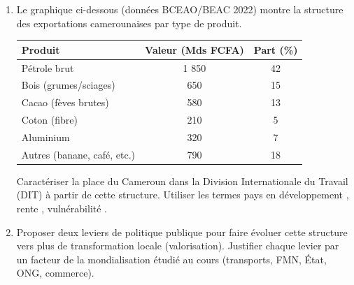 \documentclass[11pt]{article}
\begin{document}
\begin{exercice}
\begin{enumerate}
    \item Le graphique ci-dessous (données BCEAO/BEAC 2022) montre la structure des exportations camerounaises par type de produit. 
    
    \begin{center}
    \begin{tabular}{lcc}
        \hline
        \textbf{Produit} & \textbf{Valeur (Mds FCFA)} & \textbf{Part (\%)} \\
        \hline
        Pétrole brut & 1 850 & 42 \\
        Bois (grumes/sciages) & 650 & 15 \\
        Cacao (fèves brutes) & 580 & 13 \\
        Coton (fibre) & 210 & 5 \\
        Aluminium & 320 & 7 \\
        Autres (banane, café, etc.) & 790 & 18 \\
        \hline
    \end{tabular}
    \end{center}
    
    Caractériser la place du Cameroun dans la Division Internationale du Travail (DIT) à partir de cette structure. Utiliser les termes \og pays en développement \fg, \og rente \fg, \og vulnérabilité \fg.
    \item Proposer deux leviers de politique publique pour faire évoluer cette structure vers plus de transformation locale (valorisation). Justifier chaque levier par un facteur de la mondialisation étudié au cours (transports, FMN, État, ONG, commerce).
\end{enumerate}
\end{exercice}
\end{document}
